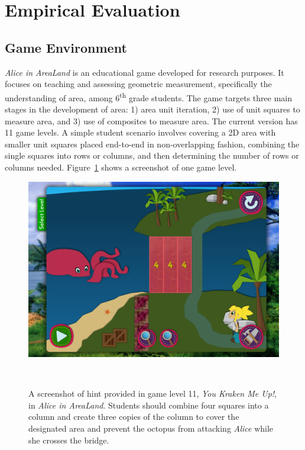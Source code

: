 \documentclass{sigchi}
\begin{document}
\section{Empirical Evaluation}

\subsection{Game Environment}
\textit {Alice in AreaLand} is an educational game developed for research purposes. It focuses on teaching and assessing geometric measurement, specifically the understanding of area, among 6\textsuperscript{th} grade students. The game targets three main stages in the development of area: 1) area unit iteration, 2) use of unit squares to measure area, and 3) use of composites to measure area. The current version has 11 game levels. A simple student scenario involves covering a 2D area with smaller unit squares placed end-to-end in non-overlapping fashion, combining the single squares into rows or columns, and then determining the number of rows or columns needed. Figure~\ref{fig:figurekracken} shows a screenshot of one game level.

\begin{figure}
	\centering
	\includegraphics[width=0.9\columnwidth]{figures/kracken}
	\caption{A screenshot of hint provided in game level 11, \textit {You Kraken Me Up!}, in \textit {Alice in AreaLand}. Students should combine four squares into a column and create three copies of the column to cover the designated area and prevent the octopus from attacking \textit {Alice} while she crosses the bridge.}~\label{fig:figurekracken}
\end{figure}
\end{document}
